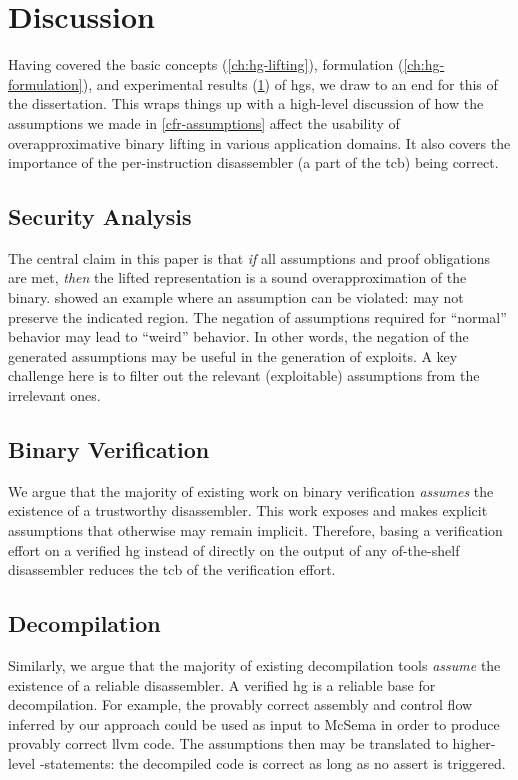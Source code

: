 \chapter{Discussion}\label{ch:hg-discussion}
Having covered the basic concepts (\cref{ch:hg-lifting}), formulation (\cref{ch:hg-formulation}), and experimental results (\cref{ch:hg-discussion}) of \glspl{hg}, we draw to an end for this  of the dissertation.
This  wraps things up with a high-level discussion of how the assumptions we made in \cref{cfr-assumptions} affect the usability of overapproximative binary lifting in various application domains.
It also covers the importance of the per-instruction disassembler (a part of the \gls{tcb}) being correct.

\section{Security Analysis}
The central claim in this paper is that \emph{if} all assumptions and proof obligations are met,
\emph{then} the lifted representation is a sound overapproximation of the binary.
 showed an example where an assumption can be violated:  may not preserve the indicated region.
The negation of assumptions required for ``normal'' behavior may lead to ``weird'' behavior.
In other words, the negation of the generated assumptions may be useful in the generation of exploits.
A key challenge here is to filter out the relevant (exploitable) assumptions from the irrelevant ones.

\section{Binary Verification}
We argue that the majority of existing work on binary verification \emph{assumes} the existence of a trustworthy disassembler.
This work exposes and makes explicit assumptions that otherwise may remain implicit.
Therefore, basing a verification effort on a verified \gls{hg} instead of directly on the output of any of-the-shelf disassembler reduces the \gls{tcb} of the verification effort.

\section{Decompilation}
Similarly, we argue that the majority of existing decompilation tools \emph{assume} the existence of a reliable disassembler.
A verified \gls{hg} is a reliable base for decompilation.
For example, the provably correct assembly and control flow inferred by our approach could be used as input to McSema \autocite{dinaburg2014mcsema} in order to produce provably correct \gls{llvm} code.
The assumptions then may be translated to higher-level -statements: the decompiled code is correct as long as no assert is triggered.

